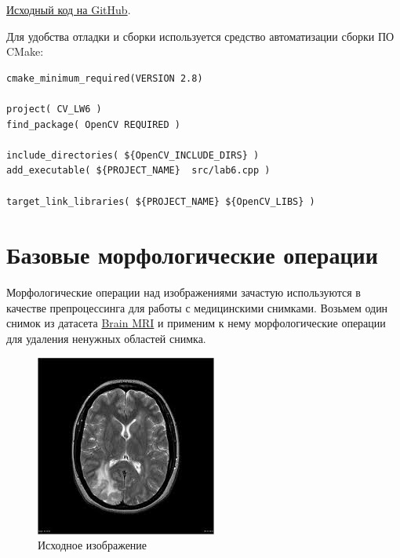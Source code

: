 \href{https://github.com/mfclabber/itmo-cv-labs/tree/main/lab6}{Исходный код на GitHub}. 

Для удобства отладки и сборки используется средство автоматизации сборки ПО CMake:
\begin{lstlisting}[style=cpp_white, caption={CMakeLists.txt для сборки проекта}]
cmake_minimum_required(VERSION 2.8)

project( CV_LW6 )
find_package( OpenCV REQUIRED )

include_directories( ${OpenCV_INCLUDE_DIRS} )
add_executable( ${PROJECT_NAME}  src/lab6.cpp )

target_link_libraries( ${PROJECT_NAME} ${OpenCV_LIBS} )
\end{lstlisting}

\section{Базовые морфологические операции}

Морфологические операции над изображениями зачастую используются в качестве препроцессинга для работы с медицинскими снимками.
Возьмем один снимок из датасета \href{https://www.kaggle.com/datasets/trainingdatapro/multiple-sclerosis-dataset}{Brain MRI} и применим к нему морфологические операции для удаления ненужных областей снимка.

\begin{figure}[H]
    \includegraphics[width=\textwidth]{../source/1.png}
    \caption{Исходное изображение}
\end{figure}

